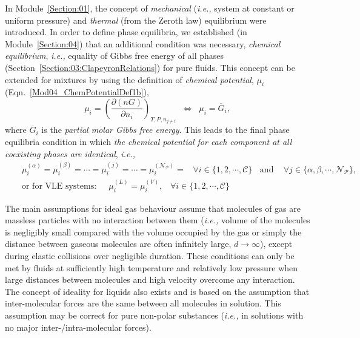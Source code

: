 \documentclass[12pts,a4paper,amsmath,amssymb,floatfix]{article}%
\newcommand{\frc}{\displaystyle\frac}
\newcommand{\ie}{{\it i.e., }}
\newcommand{\Partial}[3][error]{\left(\frc{\partial #1}{\partial #2}\right)_{#3}}
\newcommand{\mfr}[3][error]{#1_{#2}^{\left(#3\right)}}
\begin{document}
In Module~\ref{Section:01}, the concept of {\it mechanical} (\ie system at constant or uniform pressure) and {\it thermal} (from the Zeroth law) equilibrium were introduced. In order to define phase equilibria, we established (in Module~\ref{Section:04}) that an additional condition was necessary, {\it chemical equilibrium}, \ie equality of Gibbs free energy of all phases (Section~\ref{Section:03:ClapeyronRelations}) for pure fluids. This concept can be extended for mixtures by using the definition of {\it chemical potential}, $\mu_{i}$ (Eqn.~\ref{Mod04_ChemPotentialDef1b}),
         \begin{displaymath}
            \mu_{i} = \Partial[(nG)]{n_{i}}{T,P,n_{j\ne i}} \;\;\Longleftrightarrow\;\; \mu_{i} = \overline{G}_{i},
         \end{displaymath}
where $\overline{G}_{i}$ is the {\it partial molar Gibbs free energy}. This leads to the final phase equilibria condition in which {\it the chemical potential for each component at all coexisting phases are identical}, \ie 
         \begin{eqnarray}
            && \mfr[\mu]{i}{\alpha} = \mfr[\mu]{i}{\beta} = \cdots =  \mfr[\mu]{i}{j} = \cdots = \mfr[\mu]{i}{\mathcal{N}_{\mathcal{P}}} = \;\;\;\forall i\in\{1,2,\cdots,\mathcal{C}\}\;\; \text{ and }\;\;\; \forall j\in\{\alpha,\beta,\cdots,\mathcal{N}_{\mathcal{P}}\}, \nonumber \\
            &&  \text{or for VLE systems: }\;\;\;\; \mfr[\mu]{i}{L} = \mfr[\mu]{i}{V},\;\;\;\forall i\in\{1,2,\cdots,\mathcal{C}\} \nonumber 
         \end{eqnarray}

\medskip

The main assumptions for ideal gas behaviour assume that molecules of gas are massless particles with no interaction between them (\ie volume of the molecules is negligibly small compared with the volume occupied by the gas or simply the distance between gaseous molecules are often infinitely large, $d\rightarrow \infty$), except during elastic collisions over negligible duration. These conditions can only be met by fluids at sufficiently high temperature and relatively low pressure when large distances between molecules and high velocity overcome any interaction. The concept of ideality for liquids also exists and is based on the assumption that inter-molecular forces are the same between all molecules in solution. This assumption may be correct for pure non-polar substances (\ie in solutions with no major inter-/intra-molecular forces).
\end{document}
